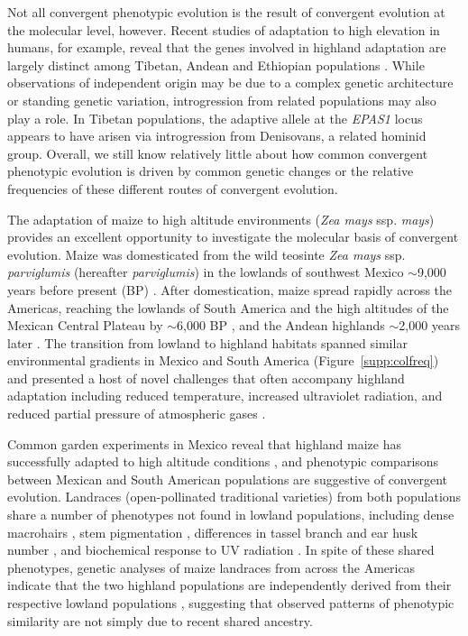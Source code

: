 Not all convergent phenotypic evolution is the result of convergent evolution at the molecular level, however.  
Recent studies of adaptation to high elevation in humans, for example, reveal that the genes involved in highland adaptation are largely distinct among Tibetan, Andean and Ethiopian populations \cite[]{Bigham_2010_20838600,Scheinfeldt_2012_22264333,Alkorta-Aranburu_2012_23236293}. 
While observations of independent origin may be due to a complex genetic architecture or standing genetic variation, introgression from related populations may also play a role.  
In Tibetan populations, the adaptive allele at the \emph{EPAS1} locus appears to have arisen via introgression from Denisovans, a related hominid group.
Overall, we still know relatively little about how common convergent phenotypic evolution is driven by common genetic changes or the relative frequencies of these different routes of convergent evolution.

The adaptation of maize to high altitude environments (\emph{Zea mays} ssp. \emph{mays}) provides an excellent opportunity to investigate the molecular basis of convergent evolution.  
Maize was domesticated from the wild teosinte \emph{Zea mays} ssp. \emph{parviglumis} (hereafter \emph{parviglumis}) in the lowlands of southwest Mexico $\sim$9,000 years before present (BP) \cite[]{Matsuoka_2002_11983901,Piperno_2009_19307570,vanHeerwaarden_2011_21189301}. 
After domestication, maize spread rapidly across the Americas, reaching the lowlands of South America and the high altitudes of the Mexican Central Plateau by $\sim$6,000 BP \cite[]{Piperno_2006_69}, and the Andean highlands $\sim$2,000 years later \cite[]{Perry_2006_16511492,Grobman_2012_22307642}. 
The transition from lowland to highland habitats spanned similar environmental gradients in Mexico and South America (Figure~\ref{supp:colfreq}) and presented a host of novel challenges that often accompany highland adaptation including reduced temperature, increased ultraviolet radiation, and reduced partial pressure of atmospheric gases \cite[]{Korner_2007_17988759}.

Common garden experiments in Mexico reveal that highland maize has successfully adapted to high altitude conditions \cite[]{Mercer2008}, and phenotypic comparisons between Mexican and South American populations are suggestive of convergent evolution.  
Landraces (open-pollinated traditional varieties) from both populations share a number of phenotypes not found in lowland populations, including dense macrohairs \cite[]{Wilkes_1977,Wellhausen1957:book}, stem pigmentation \cite[]{Wilkes_1977,Wellhausen1957:book}, differences in tassel branch and ear husk number \cite[]{brewbaker2014diversity}, and biochemical response to UV radiation \cite[]{Casati2005}. 
In spite of these shared phenotypes, genetic analyses of maize landraces from across the Americas indicate that the two highland populations are independently derived from their respective lowland populations \cite[]{Vigouroux_2008_21632329, vanHeerwaarden_2011_21189301}, suggesting that  observed patterns of phenotypic similarity are not simply due to recent shared ancestry. 

